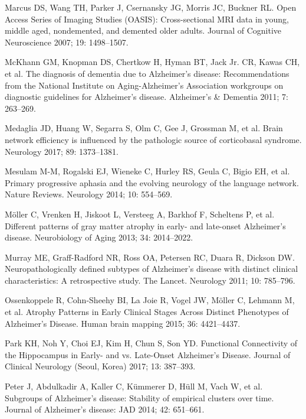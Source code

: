 \documentclass[]{article}
\begin{document}
\hypertarget{ref-marcus_open_2007}{}
Marcus DS, Wang TH, Parker J, Csernansky JG, Morris JC, Buckner RL. Open
Access Series of Imaging Studies (OASIS): Cross-sectional MRI data in
young, middle aged, nondemented, and demented older adults. Journal of
Cognitive Neuroscience 2007; 19: 1498--1507.

\hypertarget{ref-mckhann_diagnosis_2011}{}
McKhann GM, Knopman DS, Chertkow H, Hyman BT, Jack Jr. CR, Kawas CH, et
al. The diagnosis of dementia due to Alzheimer's disease:
Recommendations from the National Institute on Aging-Alzheimer's
Association workgroups on diagnostic guidelines for Alzheimer's disease.
Alzheimer's \& Dementia 2011; 7: 263--269.

\hypertarget{ref-medaglia_brain_2017}{}
Medaglia JD, Huang W, Segarra S, Olm C, Gee J, Grossman M, et al. Brain
network efficiency is influenced by the pathologic source of
corticobasal syndrome. Neurology 2017; 89: 1373--1381.

\hypertarget{ref-mesulam_primary_2014}{}
Mesulam M-M, Rogalski EJ, Wieneke C, Hurley RS, Geula C, Bigio EH, et
al. Primary progressive aphasia and the evolving neurology of the
language network. Nature Reviews. Neurology 2014; 10: 554--569.

\hypertarget{ref-moller_different_2013}{}
Möller C, Vrenken H, Jiskoot L, Versteeg A, Barkhof F, Scheltens P, et
al. Different patterns of gray matter atrophy in early- and late-onset
Alzheimer's disease. Neurobiology of Aging 2013; 34: 2014--2022.

\hypertarget{ref-murray_neuropathologically_2011}{}
Murray ME, Graff-Radford NR, Ross OA, Petersen RC, Duara R, Dickson DW.
Neuropathologically defined subtypes of Alzheimer's disease with
distinct clinical characteristics: A retrospective study. The Lancet.
Neurology 2011; 10: 785--796.

\hypertarget{ref-ossenkoppele_atrophy_2015}{}
Ossenkoppele R, Cohn-Sheehy BI, La Joie R, Vogel JW, Möller C, Lehmann
M, et al. Atrophy Patterns in Early Clinical Stages Across Distinct
Phenotypes of Alzheimer's Disease. Human brain mapping 2015; 36:
4421--4437.

\hypertarget{ref-park_functional_2017}{}
Park KH, Noh Y, Choi EJ, Kim H, Chun S, Son YD. Functional Connectivity
of the Hippocampus in Early- and vs. Late-Onset Alzheimer's Disease.
Journal of Clinical Neurology (Seoul, Korea) 2017; 13: 387--393.

\hypertarget{ref-peter_subgroups_2014}{}
Peter J, Abdulkadir A, Kaller C, Kümmerer D, Hüll M, Vach W, et al.
Subgroups of Alzheimer's disease: Stability of empirical clusters over
time. Journal of Alzheimer's disease: JAD 2014; 42: 651--661.
\end{document}

